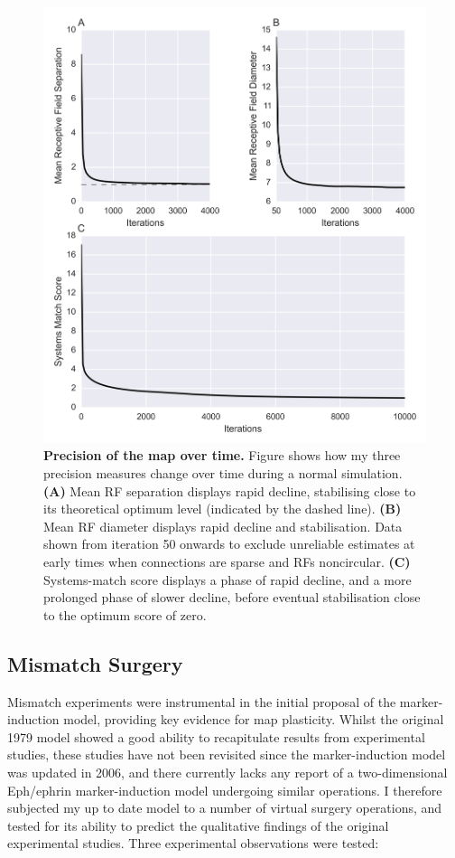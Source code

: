 \documentclass[11pt]{"article"}
\begin{document}
\begin{figure}
\includegraphics[scale=0.67]{PrecisionPlot}
\caption{\textbf{Precision of the map over time.}
Figure shows how my three precision measures change over time during a normal simulation.
\textbf{(A)} Mean RF separation displays rapid decline, stabilising close to its theoretical optimum level (indicated by the dashed line).
\textbf{(B)} Mean RF diameter displays rapid decline and stabilisation. 
Data shown from iteration 50 onwards to exclude unreliable estimates at early times when connections are sparse and RFs noncircular.
\textbf{(C)} Systems-match score displays a phase of rapid decline, and a more prolonged phase of slower decline, before eventual stabilisation close to the optimum score of zero.}
\end{figure}

\pagebreak

\subsection{Mismatch Surgery}
Mismatch experiments were instrumental in the initial proposal of the marker-induction model, providing key evidence for map plasticity. Whilst the original 1979 model showed a good ability to recapitulate results from experimental studies, these studies have not been revisited since the marker-induction model was updated in 2006, and there currently lacks any report of a two-dimensional Eph/ephrin marker-induction model undergoing similar operations. I therefore subjected my up to date model to a number of virtual surgery operations, and tested for its ability to predict the qualitative findings of the original experimental studies. Three experimental observations were tested:\\
\end{document}
